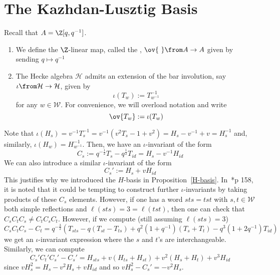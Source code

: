 \documentclass[11pt,leqno,oneside]{amsart}
\numberwithin{thm}{section}
\renewcommand{\W}{\mathcal{W}}
\renewcommand{\H}{\mathcal{H}} %
\begin{document}
\section{The Kazhdan-Lusztig Basis}
\begin{defn}
  Recall that \(A = \Z[q,q^{-1}]\).
  \begin{enumerate}
  \item We define the \(\Z\)-linear map, called the , \(\ov{\ } \from A \to A\)
    given by sending \(q \mapsto q^{-1}\)
  \item   The Hecke algebra \(\H\) admits an extension of the bar
    involution, say \(\iota \from \H
  \to \H\), given by \[
    \iota(T_w) := T_{w^{-1}}^{-1}
  \]
  for any \(w \in \W\). For convenience, we will overload notation and
  write \[
    \ov{T_w} := \iota(T_w)
  \]
  \end{enumerate}
\end{defn}
Note that \(\iota(H_s) = v^{-1} T_{s}^{-1} = v^{-1}(v^2 T_s - 1 + v^2
) = H_s - v^{-1} + v = H_s^{-1} \) and, similarly, \(\iota(H_w) = H_{w^{-1}}^{-1}\).
 Then, we have an \(\iota\)-invariant
 of the form \[
   C_s := q^{-\frac{1}{2}} T_s - q^{\frac{1}{2}} T_{id} = H_s-v^{-1} H_{id}
 \]
 We can also introduce a similar \(\iota\)-invariant of the form \[
   C_s' := H_s+v H_{id}
 \]
 This justifies why we introduced the \(H\)-basis in
 Proposition~\ref{H-basis}. 
 In~\cite{humphreys}*{p 158}, it is noted that it could be tempting to
 construct further \(\iota\)-invariants by taking products of these
 \(C_s\) elements. However, if one has a word \(sts = tst\) with \(s,t
 \in \W\) both simple reflections and \(\ell(sts) = 3 = \ell(tst)\),
 then one can check that \(C_s C_t C_s \neq C_t C_s C_t\). However, if
 we compute (still assuming \(\ell(sts) = 3\)) \[
   C_s C_t C_s - C_t = q^{-\frac{3}{2}}(T_{sts}-q(T_{st}-T_{ts})+q^2(1+q^{-1})(T_s+T_t)-q^3(1+2q^{-1})T_{id})
 \]
 we get an \(\iota\)-invariant expression where the \(s\) and \(t\)'s
 are interchangeable. Similarly, we can compute \[
   C_s' C_t' C_s' - C_s' = H_{sts} + v(H_{ts}+H_{st})+v^2(H_s+H_t) + v^3
   H_{id}
 \]
 since \(vH_s^2 = H_s-v^2H_s+vH_{id}\) and so \(vH_s^2 - C_s' = -v^2 H_s\).
 
\end{document}

